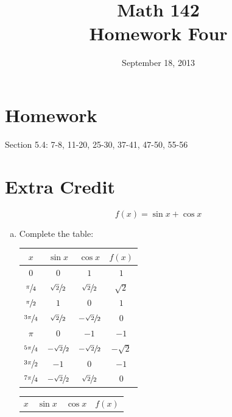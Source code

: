 \documentclass{exam}
\author{}
\date{September 18, 2013}
\title{Math 142 \\ Homework Four}
\begin{document}
  \maketitle

  \section{Homework}
  Section 5.4: 7-8, 11-20, 25-30, 37-41, 47-50, 55-56

  \section{Extra Credit}
  \[
    f(x) = \sin x + \cos x
  \]

  \begin{enumerate}[(a)]
    \item Complete the table:
      \ifprintanswers
        \begin{tabular}[H]{cccc}
          \toprule
          $x$                & $\sin x$                & $\cos x$                & $f(x)$ \\
          \midrule
          $0$                & $0$                     & $1$                     & $1$ \\
          \midrule
          $\sfrac{\pi}{4}$   & $\sfrac{\sqrt{2}}{2}$   & $\sfrac{\sqrt{2}}{2}$   & $\sqrt{2}$ \\
          \midrule
          $\sfrac{\pi}{2}$   & $1$                     & $0$                     & $1$ \\
          \midrule
          $\sfrac{3 \pi}{4}$ & $\sfrac{\sqrt{2}}{2}$   & $- \sfrac{\sqrt{2}}{2}$ & $0$ \\
          \midrule
          $\pi$              & $0$                     & $-1$                    & $-1$ \\
          \midrule
          $\sfrac{5 \pi}{4}$ & $- \sfrac{\sqrt{2}}{2}$ & $- \sfrac{\sqrt{2}}{2}$ & $- \sqrt{2}$ \\
          \midrule
          $\sfrac{3 \pi}{2}$ & $-1$                    & $0$                     & $-1$ \\
          \midrule
          $\sfrac{7 \pi}{4}$ & $- \sfrac{\sqrt{2}}{2}$ & $\sfrac{\sqrt{2}}{2}$   & $0$ \\
          \bottomrule
        \end{tabular}
      \else
        \begin{tabular}[H]{cccc}
          \toprule
          $x$                & $\sin x$ & $\cos x$ & $f(x)$ \\

\end{tabular}
\end{enumerate}
\end{document}
